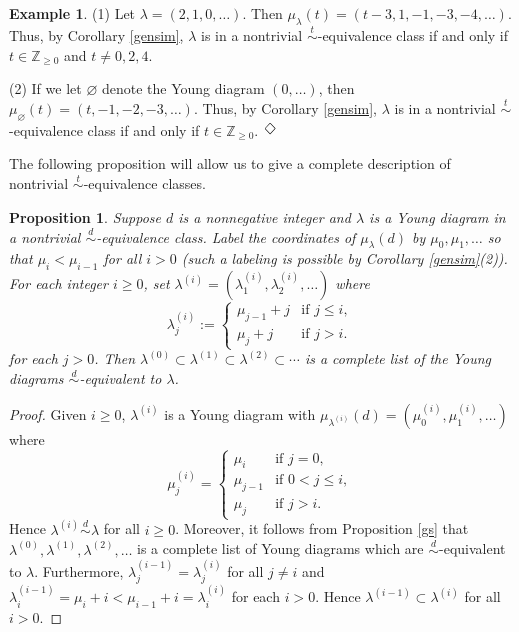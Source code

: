 \documentclass{amsart}
\newtheorem{proposition}[theorem]{Proposition}
\theoremstyle{definition}
\newtheorem{example}[theorem]{Example}
\renewcommand{\1}{_{(1)}}
\renewcommand{\2}{_{(2)}}
\newcommand{\3}{_{(3)}}
\newcommand{\4}{_{(4)}}
\newcommand{\Z}{\mathbb{Z}}
\newcommand{\Dox}{\rotatebox{45}{$\Box$} }
\begin{document}
\begin{example} (1) Let $\lambda=(2, 1, 0,\ldots)$.  Then $\mu_\lambda(t)=(t-3, 1, -1, -3, -4,\ldots)$.  Thus, by Corollary \ref{gensim}, $\lambda$ is in a nontrivial $\stackrel{t}{\sim}$-equivalence class if and only if $t\in\Z_{\geq 0}$ and $t\not=0, 2, 4$.  

(2)  If we let $\varnothing$ denote the Young diagram $(0,\ldots)$, then $\mu_\varnothing(t)=(t, -1, -2, -3,\ldots)$.  Thus, by Corollary \ref{gensim}, $\lambda$ is in a nontrivial $\stackrel{t}{\sim}$-equivalence class if and only if $t\in\Z_{\geq 0}$.~\hfill$\Dox$
\end{example}

The following proposition will allow us to give a complete description of nontrivial $\stackrel{t}{\sim}$-equivalence classes.




\begin{proposition}\label{mindiagprop} Suppose $d$ is a nonnegative integer and $\lambda$ is a Young diagram in a nontrivial $\stackrel{d}{\sim}$-equivalence class.  Label the coordinates of $\mu_\lambda(d)$ by $\mu_0, \mu_1,\ldots$ so that $\mu_{i}<\mu_{i-1}$ for all $i>0$ (such a labeling is possible by Corollary \ref{gensim}(2)).  For each integer $i\geq0$, set $\lambda^{(i)}=(\lambda^{(i)}_1, \lambda^{(i)}_2,\ldots)$ where \begin{equation}\label{lambdai}\lambda_j^{(i)}:=\left\{\begin{array}{ll}
\mu_{j-1}+j &\text{if $j\leq i$},\\
\mu_j+j & \text{if $j>i$}.
\end{array}\right.\end{equation} for each $j>0$.   Then $\lambda^{(0)}\subset\lambda^{(1)}\subset\lambda^{(2)}\subset\cdots$ is a complete list of the Young diagrams $\stackrel{d}{\sim}$-equivalent to $\lambda$.
\end{proposition}

\begin{proof}   Given $i\geq0$,  $\lambda^{(i)}$ is a Young diagram with $\mu_{\lambda^{(i)}}(d)=(\mu_0^{(i)}, \mu_1^{(i)},\ldots)$ where $$\mu_j^{(i)}=\left\{\begin{array}{ll}
\mu_{i} &\text{if $j=0$},\\
\mu_{j-1} & \text{if $0<j\leq i$},\\
\mu_j &  \text{if $j> i$}.
\end{array}\right.$$  Hence $\lambda^{(i)}\stackrel{d}{\sim}\lambda$ for all $i\geq0$.  Moreover, it follows from Proposition \ref{gs} that $\lambda^{(0)}, \lambda^{(1)}, \lambda^{(2)},\ldots$ is a complete list of Young diagrams which are $\stackrel{d}{\sim}$-equivalent to $\lambda$.  
Furthermore,  
$\lambda^{(i-1)}_j=\lambda^{(i)}_j$ for all $j\not=i$ and $\lambda^{(i-1)}_{i}=\mu_i+i<\mu_{i-1}+i=\lambda^{(i)}_i$ for each $i>0$.  Hence $\lambda^{(i-1)}\subset\lambda^{(i)}$ for all $i>0$.  
\end{proof}
\end{document}
